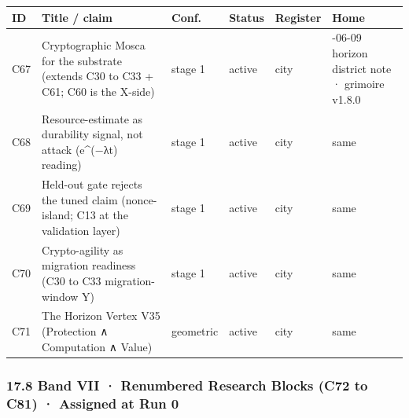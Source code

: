 \documentclass[
  11pt,
]{article}
\newcounter{none} %
\begin{document}
{\def\LTcaptype{none} %
\begin{longtable}[]{@{}
  >{\raggedright\arraybackslash}p{}
  >{\raggedright\arraybackslash}p{}
  >{\raggedright\arraybackslash}p{}
  >{\raggedright\arraybackslash}p{}
  >{\raggedright\arraybackslash}p{}
  >{\raggedright\arraybackslash}p{}@{}}
\toprule\noalign{}
\begin{minipage}[b]{\linewidth}\raggedright
ID
\end{minipage} & \begin{minipage}[b]{\linewidth}\raggedright
Title / claim
\end{minipage} & \begin{minipage}[b]{\linewidth}\raggedright
Conf.
\end{minipage} & \begin{minipage}[b]{\linewidth}\raggedright
Status
\end{minipage} & \begin{minipage}[b]{\linewidth}\raggedright
Register
\end{minipage} & \begin{minipage}[b]{\linewidth}\raggedright
Home
\end{minipage} \\
\midrule\noalign{}
\endhead
\bottomrule\noalign{}
\endlastfoot
C67 & Cryptographic Mosca for the substrate (extends C30 to C33 + C61;
C60 is the X-side) & stage 1 & active & city & 2026-06-09 horizon
district note · grimoire v1.8.0 \\
C68 & Resource-estimate as durability signal, not attack (e\^{}(−λt)
reading) & stage 1 & active & city & same \\
C69 & Held-out gate rejects the tuned claim (nonce-island; C13 at the
validation layer) & stage 1 & active & city & same \\
C70 & Crypto-agility as migration readiness (C30 to C33 migration-window
Y) & stage 1 & active & city & same \\
C71 & The Horizon Vertex V35 (Protection ∧ Computation ∧ Value) &
geometric & active & city & same \\
\end{longtable}
}

\subsubsection{17.8 Band VII · Renumbered Research Blocks (C72 to C81) ·
Assigned at Run
0}\label{band-vii-renumbered-research-blocks-c72-to-c81-assigned-at-run-0}
\end{document}
